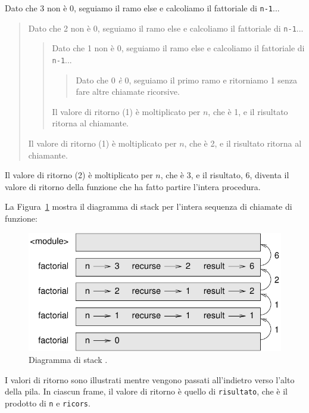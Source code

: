 \documentclass[10pt]{book}
\begin{document}
Dato che 3 non è 0, seguiamo il ramo else e calcoliamo il fattoriale
   di {\tt n-1}...

\begin{quote}
Dato che 2 non è 0, seguiamo il ramo else e calcoliamo il fattoriale di {\tt n-1}...


  \begin{quote}
  Dato che 1 non è 0, seguiamo il ramo else e calcoliamo il fattoriale di {\tt n-1}...


    \begin{quote}
    Dato che 0 {\em è} 0, seguiamo il primo ramo e ritorniamo 1 senza fare altre chiamate ricorsive.
    \end{quote}


  Il valore di ritorno (1) è moltiplicato per $n$, che è 1, e il risultato
     ritorna al chiamante.
  \end{quote}


Il valore di ritorno (1) è moltiplicato per $n$, che è 2, e il risultato
     ritorna al chiamante.
\end{quote}


Il valore di ritorno (2) è moltiplicato per $n$, che è 3, e il risultato, 6, diventa il valore di ritorno della funzione che ha fatto partire l'intera procedura.

La Figura~\ref{fig.stack3} mostra il diagramma di stack per l'intera sequenza di chiamate di funzione:

\begin{figure}
\centerline
{\includegraphics[scale=0.8]{figs/stack3.pdf}}
\caption{Diagramma di stack .}
\label{fig.stack3}
\end{figure}

I valori di ritorno sono illustrati mentre vengono passati all'indietro verso l'alto della pila. In ciascun frame, il valore di ritorno è quello di {\tt risultato}, che è il prodotto di {\tt n} e {\tt ricors}.
\end{document}

